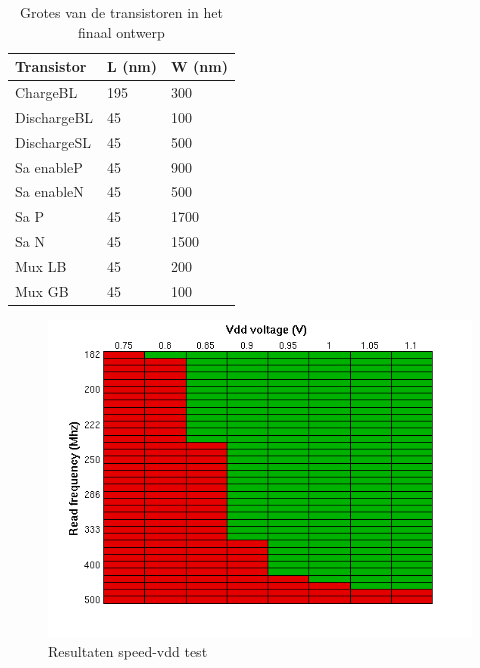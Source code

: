 \begin{table}
\begin{center}
\begin{tabularx}{\textwidth}{XXX}
\hline
Transistor & L (nm) & W (nm)\\
\hline
ChargeBL & 195 & 300 \\
DischargeBL & 45 & 100 \\
DischargeSL & 45 & 500 \\
Sa enableP & 45 & 900 \\
Sa enableN & 45 & 500 \\
Sa P & 45 & 1700 \\
Sa N & 45 & 1500 \\
Mux LB & 45 & 200 \\
Mux GB & 45 & 100 \\
\hline
\end{tabularx}
\end{center}
\caption{Grotes van de transistoren in het finaal ontwerp}
\label{tab:transsize}
\end{table}
	
\begin{figure}[!ht]
  \centering
  \includegraphics[scale=0.8]{../fig/hfdst-final-vddspeed.png}
  \caption{Resultaten speed-vdd test}
  \label{fig:speedvdd}
\end{figure}

